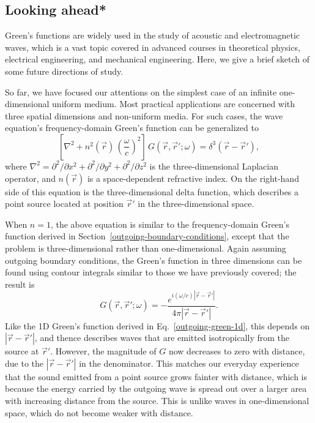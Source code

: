 \documentclass[10pt,a4paper]{article}
\begin{document}
\subsection{Looking ahead*}\label{looking-ahead}

Green's functions are widely used in the study of acoustic and
electromagnetic waves, which is a vast topic covered in advanced
courses in theoretical physics, electrical engineering, and mechanical
engineering. Here, we give a brief sketch of some future directions of
study.

So far, we have focused our attentions on the simplest case of an
infinite one-dimensional uniform medium. Most practical applications
are concerned with three spatial dimensions and non-uniform media. For
such cases, the wave equation's frequency-domain Green's function can
be generalized to
\begin{equation}
\left[\nabla^2 + n^2(\vec{r}) \, \left(\frac{\omega}{c}\right)^2\right]\, G(\vec{r},\vec{r}';\omega) = \delta^3(\vec{r}-\vec{r}'),
\end{equation}
where $\nabla^2 = \partial^2/\partial x^2 + \partial^2/\partial y^2 +
\partial^2/\partial z^2$ is the three-dimensional Laplacian operator,
and $n(\vec{r})$ is a space-dependent refractive index. On the
right-hand side of this equation is the three-dimensional delta
function, which describes a point source located at position
$\vec{r}'$ in the three-dimensional space.

When $n = 1$, the above equation is similar to the frequency-domain
Green's function derived in
Section~\ref{outgoing-boundary-conditions}, except that the problem is
three-dimensional rather than one-dimensional. Again assuming outgoing
boundary conditions, the Green's function in three dimensions can be
found using contour integrals similar to those we have previously
covered; the result is
\begin{equation}
G(\vec{r},\vec{r}';\omega) = -\frac{e^{i(\omega/c)|\vec{r}-\vec{r}'|}}{4\pi|\vec{r}-\vec{r}'|}.
\end{equation}
Like the 1D Green's function derived in Eq.~\eqref{outgoing-green-1d},
this depends on $|\vec{r}-\vec{r}'|$, and thence describes waves that
are emitted isotropically from the source at $\vec{r}'$. However, the
magnitude of $G$ now decreases to zero with distance, due to the
$|\vec{r}-\vec{r}'|$ in the denominator. This matches our everyday
experience that the sound emitted from a point source grows fainter
with distance, which is because the energy carried by the outgoing
wave is spread out over a larger area with increasing distance from
the source.  This is unlike waves in one-dimensional space, which do
not become weaker with distance.
\end{document}
